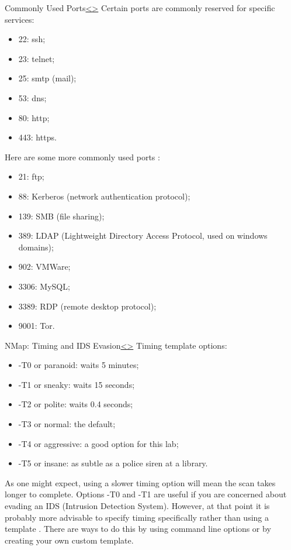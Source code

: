 \documentclass[12pt]{article}
\newenvironment{instructionblock}{\Large\bgroup}{\egroup}
\begin{document}
\pagebreak
\begin{slide}{Commonly Used Ports}{\hyperref[slide 10]{\textless}\hyperref[slide 12]{\textgreater}}
\begin{instructionblock}
Certain ports are commonly reserved for specific services:
\begin{itemize}
\item 22: ssh;
\item 23: telnet;
\item 25: smtp (mail);
\item 53: dns;
\item 80: http;
\item 443: https.
\end{itemize}
\end{instructionblock}
\end{slide}
Here are some more commonly used ports \cite{rtfm}:
\begin{itemize}
\item 21: ftp;
\item 88: Kerberos (network authentication protocol);
\item 139: SMB (file sharing);
\item 389: LDAP (Lightweight Directory Access Protocol, used on windows domains);
\item 902: VMWare;
\item 3306: MySQL;
\item 3389: RDP (remote desktop protocol);
\item 9001: Tor.
\end{itemize}




\pagebreak
\begin{slide}{ NMap: Timing and IDS Evasion}{\hyperref[slide 11]{\textless}\hyperref[slide 13]{\textgreater}}
   \begin{instructionblock}
Timing template options:
      \begin{itemize}
\item -T0 or paranoid: waits 5 minutes;
\item -T1 or sneaky: waits 15 seconds;
\item -T2 or polite: waits 0.4 seconds;
\item -T3 or normal: the default;
\item -T4 or aggressive: a good option for this lab;
\item -T5 or insane: as subtle as a police siren at a library.
      \end{itemize}
   \end{instructionblock}
\end{slide}
As one might expect, using a slower timing option will mean the scan takes longer to complete. Options -T0 and -T1 are useful if you are concerned about evading an IDS (Intrusion Detection System). However, at that point it is probably more advisable to specify timing specifically rather than using a template \cite{ NMap}. There are ways to do this by using command line options or by creating your own custom template.
\end{document}
